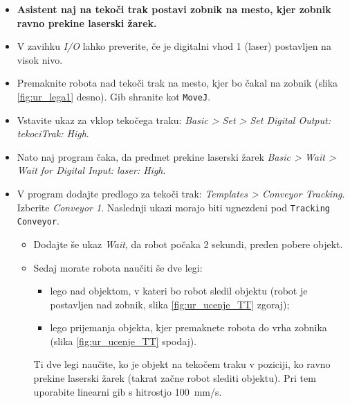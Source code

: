   \begin{mdframed}[backgroundcolor=red!20, shadow=true,roundcorner=8pt]
\begin{itemize}
  \item \textbf{Asistent naj na tekoči trak postavi zobnik na mesto, kjer zobnik ravno prekine laserski žarek.}
\end{itemize}

\end{mdframed}
  \begin{mdframed}[backgroundcolor=yellow!20, shadow=true,roundcorner=8pt]
\begin{itemize}
    \item  V zavihku \emph{I/O} lahko preverite, če je digitalni vhod 1 (laser) postavljen na visok nivo.
  \item Premaknite robota nad tekoči trak na mesto, kjer bo čakal na zobnik (slika \ref{fig:ur_lega1} desno). Gib shranite kot \verb"MoveJ".
%
%
%
  \item Vstavite ukaz za vklop tekočega traku: \emph{Basic > Set > Set Digital Output: tekociTrak: High}.
  \item Nato naj program čaka, da predmet prekine laserski žarek \emph{Basic > Wait > Wait for Digital Input: laser: High}.
  \item V program dodajte predlogo za tekoči trak:  \emph{Templates > Conveyor Tracking}. Izberite \emph{Conveyor 1}. Naslednji ukazi morajo biti ugnezdeni pod \verb"Tracking Conveyor".
  \begin{itemize}
      \item Dodajte še ukaz \emph{Wait}, da robot počaka 2 sekundi, preden pobere objekt.
      \item Sedaj morate robota naučiti še dve legi:
      \begin{itemize}
        \item lego nad objektom, v kateri bo robot sledil objektu (robot je postavljen nad zobnik, slika \ref{fig:ur_ucenje_TT} zgoraj);
        \item lego prijemanja objekta, kjer premaknete robota do vrha zobnika (slika \ref{fig:ur_ucenje_TT} spodaj).
      \end{itemize}
      Ti dve legi naučite, ko je objekt na tekočem traku v poziciji, ko ravno prekine laserski žarek (takrat začne robot slediti objektu). Pri tem uporabite linearni gib s hitrostjo 100~mm/s.

\end{itemize}
\end{itemize}
\end{mdframed}
